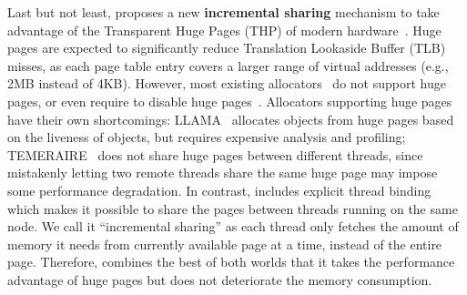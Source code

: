 Last but not least, \NM{} proposes a new \textbf{incremental sharing} mechanism to take advantage of the Transparent Huge Pages (THP) of modern hardware~\cite{hugepage}. Huge pages are expected to significantly reduce Translation Lookaside Buffer (TLB) misses, as each page table entry covers a larger range of virtual addresses (e.g., 2MB instead of 4KB). However, most existing allocators~\cite{dlmalloc, Hoard, Scalloc} do not support huge pages, or even require to disable huge pages~\cite{scallochugepage}.  
Allocators supporting huge pages have their own shortcomings: LLAMA~\cite{LLAMA} allocates objects from huge pages based on the liveness of objects, but requires expensive analysis and profiling; TEMERAIRE~\cite{TEMERAIRE} does not share huge pages between different threads, since mistakenly letting two remote threads share the same huge page may impose some performance degradation.
In contrast, \NM{} includes explicit thread binding which makes it possible to share the pages between threads running on the same node. We call it ``incremental sharing'' as each thread only fetches the amount of memory it needs from currently available page at a time, instead of the entire page.
Therefore, \NM{} combines the best of both worlds that it takes the performance advantage of huge pages but does not deteriorate the memory consumption. 


